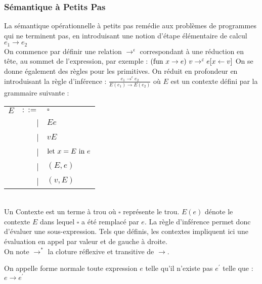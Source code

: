 \documentclass{cours}
\newcommand*{\letin}[1]{\textmd{let } #1 \textmd{ in }}
\begin{document}
\subsubsection{Sémantique à Petits Pas}
La sémantique opérationnelle à petits pas remédie aux problèmes de programmes qui ne terminent pas, en introduisant une notion d'étape élémentaire de calcul $e_{1} \rightarrow e_{2}$\\
On commence par définir une relation $\rightarrow^{\epsilon}$ correspondant à une réduction en tête, au sommet de l'expression, par exemple : $(\textmd{fun } x\rightarrow e)\ v \rightarrow^{\epsilon} e[x \leftarrow v]$
On se donne également des règles pour les primitives. On réduit en profondeur en introduisant la règle d'inférence : $\frac{e_{1}\rightarrow^{\epsilon} e_{2}}{E(e_{1})\rightarrow E(e_{2})}$ où $E$ est un contexte défini par la grammaire suivante :
\begin{tabular}{crl}
    $E$ &$::=$& $\square$\\
    &|& $E e$\\
    &|& $v E$\\
    &|& $\letin{x = E} e$\\
    &|& $(E, e)$\\
    &|& $(v, E)$\\
\end{tabular}\\
Un Contexte est un terme à trou où $\square$ représente le trou. $E(e)$ dénote le contexte $E$ dans lequel $\square$ a été remplacé par $e$. La règle d'inférence permet donc d'évaluer une sous-expression. Tels que définis, les contextes impliquent ici une évaluation en appel par valeur et de gauche à droite. \\
On note $\rightarrow^{*}$ la cloture réflexive et transitive de $\rightarrow$.
\begin{definition}
    On appelle forme normale toute expression $e$ telle qu'il n'existe pas $e^{'}$ telle que : $e \rightarrow e^{'}$
\end{definition}
\end{document}
